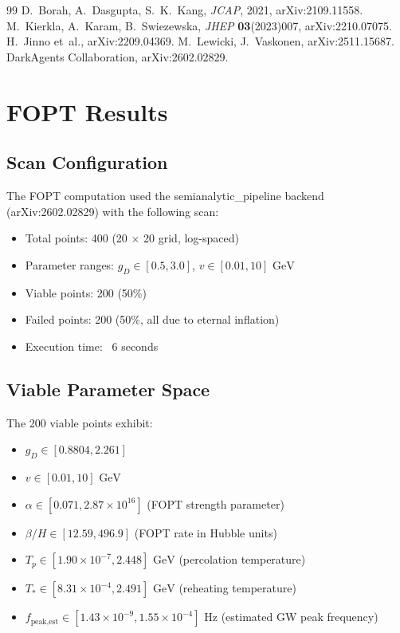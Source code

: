 \documentclass[11pt,a4paper,oneside]{article}
\begin{document}
\begin{thebibliography}{99}
 D.~Borah, A.~Dasgupta, S.~K.~Kang, \emph{JCAP}, 2021, arXiv:2109.11558.
 M.~Kierkla, A.~Karam, B.~Swiezewska, \emph{JHEP} \textbf{03}(2023)007, arXiv:2210.07075.
 H.~Jinno et~al., arXiv:2209.04369.
 M.~Lewicki, J.~Vaskonen, arXiv:2511.15687.
 DarkAgents Collaboration, arXiv:2602.02829.
\end{thebibliography}

\section{FOPT Results}
\label{sec:fopt}

\subsection{Scan Configuration}
The FOPT computation used the semianalytic{\_}pipeline backend (arXiv:2602.02829) with the following scan:
\begin{itemize}
\item Total points: 400 (20 $\times$ 20 grid, log-spaced)
\item Parameter ranges: $g_D \in [0.5, 3.0]$, $v \in [0.01, 10] \text{ GeV}$
\item Viable points: 200 (50\%)
\item Failed points: 200 (50\%, all due to eternal inflation)
\item Execution time: ~6 seconds
\end{itemize}

\subsection{Viable Parameter Space}
The 200 viable points exhibit:
\begin{itemize}
\item $g_D \in [0.8804, 2.261]$
\item $v \in [0.01, 10] \text{ GeV}$
\item $\alpha \in [0.071, 2.87 \times 10^{16}]$ (FOPT strength parameter)
\item $\beta/H \in [12.59, 496.9]$ (FOPT rate in Hubble units)
\item $T_p \in [1.90 \times 10^{-7}, 2.448] \text{ GeV}$ (percolation temperature)
\item $T_* \in [8.31 \times 10^{-4}, 2.491] \text{ GeV}$ (reheating temperature)
\item $f_{\text{peak,est}} \in [1.43 \times 10^{-9}, 1.55 \times 10^{-4}] \text{ Hz}$ (estimated GW peak frequency)
\end{itemize}
\end{document}
